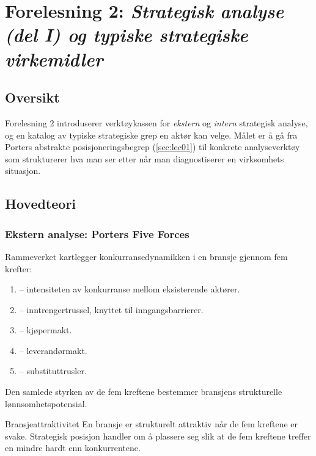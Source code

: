 \section{Forelesning 2: \emph{Strategisk analyse (del I) og typiske strategiske virkemidler}}
\label{sec:lec02}

\subsection*{Oversikt}
Forelesning 2 introduserer verktøykassen for \emph{ekstern} og \emph{intern}
strategisk analyse, og en katalog av typiske strategiske grep en aktør kan velge.
Målet er å gå fra Porters abstrakte posisjoneringsbegrep (\autoref{sec:lec01})
til konkrete analyseverktøy som strukturerer hva man ser etter når man
diagnostiserer en virksomhets situasjon.

\subsection{Hovedteori}

\subsubsection*{Ekstern analyse: Porters Five Forces}
Rammeverket kartlegger konkurransedynamikken i en bransje gjennom fem krefter:
\begin{enumerate}
  \item {} -- intensiteten av konkurranse mellom
    eksisterende aktører.
  \item {} -- inntrengertrussel, knyttet til
    inngangsbarrierer.
  \item {} -- kjøpermakt.
  \item {} -- leverandørmakt.
  \item {} -- substituttrusler.
\end{enumerate}
Den samlede styrken av de fem kreftene bestemmer bransjens strukturelle
lønnsomhetspotensial.

\begin{definition}{Bransjeattraktivitet}
En bransje er strukturelt attraktiv når de fem kreftene er svake. Strategisk
posisjon handler om å plassere seg slik at de fem kreftene treffer en mindre
hardt enn konkurrentene.
\end{definition}

